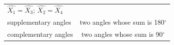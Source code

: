 {\begin{tabular}[t]{|l|l|l|}
        
                  \begin{math}\hat{{X}_{1}}=\hat{{X}_{3}}\end{math};
                  \begin{math}\hat{{X}_{2}}=\hat{{X}_{4}}\end{math}
     \tabularnewline\cline{1-1}\cline{2-2}\cline{3-3}
    
    
        supplementary angles &
    \multicolumn{2}{c|}{two angles whose sum is 180\begin{math}{}^{\circ }\end{math}}
     \tabularnewline\cline{1-1}\cline{2-2}\cline{3-3}
    
    
        complementary angles &
    \multicolumn{2}{c|}{two angles whose sum is 90\begin{math}{}^{\circ }\end{math}}
     \tabularnewline\cline{1-1}\cline{2-2}\cline{3-3}
    \end{tabular}} %

